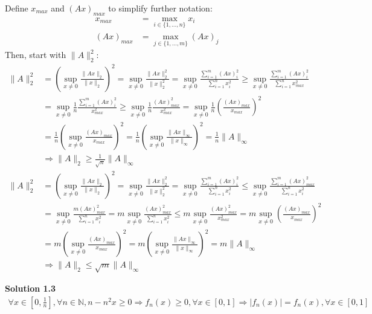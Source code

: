 \documentclass[a4paper,10.5pt]{article}
\newcommand{\N}{\mathbb{N}}
\newcommand{\supx}{\sup_{x\neq0}}
\begin{document}
Define $x_{max}$ and $\left(Ax\right)_{max}$ to simplify further notation:
\begin{align*}
	x_{max} &= \max_{i\in\{1,\dots,n\}} x_i \\
	\left(Ax\right)_{max} &= \max_{j\in\{1,\dots,m\}}\left(Ax\right)_j
\end{align*}
Then, start with $\|A\|_2^2$:
\begin{align*}
\|A\|_2^2&=\left(\supx\frac{\|Ax\|_2}{\|x\|_2}\right)^2=\supx\frac{\|Ax\|_2^2}{\|x\|_2^2} = \supx \frac{\sum_{i=1}^{m} \left(Ax\right)_i^2}{\sum_{i=1}^{n} x_i^2} \geq \supx \frac{\sum_{i=1}^{m} \left(Ax\right)_i^2}{\sum_{i=1}^{n} x_{max}^2} \\
&=\supx \frac{1}{n}\frac{\sum_{i=1}^{m} \left(Ax\right)_i^2}{x_{max}^2} \geq \supx \frac{1}{n}\frac{\left(Ax\right)_{max}^2}{x_{max}^2} = \supx \frac{1}{n} \left(\frac{\left(Ax\right)_{max}}{x_{max}}\right)^2 \\
&= \frac{1}{n}  \left(\supx\frac{\left(Ax\right)_{max}}{x_{max}}\right)^2 =\frac{1}{n} \left(\supx \frac{\|Ax\|_\infty}{\|x\|_\infty}\right)^2= \frac{1}{n}\|A\|_\infty \\
&\Rightarrow \|A\|_2 \geq \frac{1}{\sqrt{n}}\|A\|_\infty
\end{align*}
\begin{align*}
\|A\|_2^2&=\left(\supx\frac{\|Ax\|_2}{\|x\|_2}\right)^2=\supx\frac{\|Ax\|_2^2}{\|x\|_2^2} = \supx \frac{\sum_{i=1}^{m} \left(Ax\right)_{i}^2}{\sum_{i=1}^{n} x_i^2} \leq \supx \frac{\sum_{i=1}^{m} \left(Ax\right)_{max}^2}{\sum_{i=1}^{n} x_{i}^2} \\&= \supx \frac{m \left(Ax\right)_{max}^2}{\sum_{i=1}^{n} x_{i}^2} = m\supx \frac{\left(Ax\right)_{max}^2}{\sum_{i=1}^{n} x_{i}^2} \leq m\supx \frac{\left(Ax\right)_{max}^2}{x_{max}^2} = m\supx \left(\frac{\left(Ax\right)_{max}}{x_{max}}\right)^2 \\
&=m\left(\supx \frac{\left(Ax\right)_{max}}{x_{max}}\right)^2 = m\left(\supx \frac{\|Ax\|_\infty}{\|x\|_\infty}\right)^2 = m\|A\|_\infty \\
&\Rightarrow \|A\|_2 \leq \sqrt{m}\|A\|_\infty
\end{align*}

\clearpage

\noindent \textbf {Solution 1.3} \\
\begin{align*}
\forall x \in \left[0,\frac{1}{n}\right], \forall n \in \N, n - n^2 x \geq 0 \Rightarrow f_n (x) \geq 0, \forall x \in [0,1] \Rightarrow \lvert f_n(x) \rvert = f_n(x), \forall x \in [0,1] \\
\end{align*}
\end{document}

